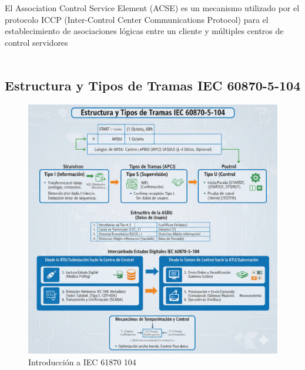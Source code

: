 \documentclass[a5paper]{book}%
\begin{document}
El Association Control Service Element (ACSE) es un mecanismo utilizado por el protocolo ICCP (Inter-Control Center Communications Protocol) para el establecimiento de asociaciones lógicas entre un cliente y múltiples centros de control servidores\\\\




\subsection{Estructura y Tipos de Tramas IEC 60870-5-104}

\begin{figure}[H]
  \caption{Introducción a IEC 61870 104}
  \label{fig:capa7iccp}
  \includegraphics[width=\linewidth]{resumen_iec_61870_104}
\end{figure}
\end{document}
